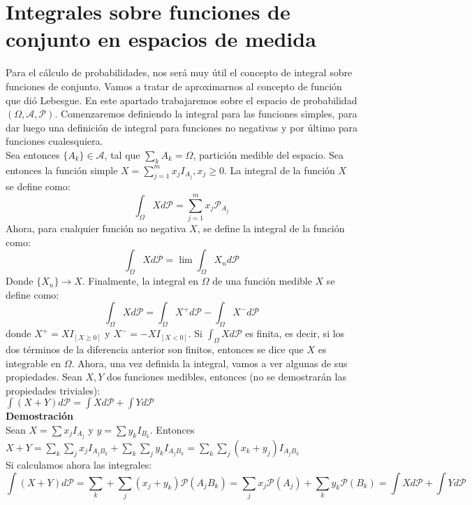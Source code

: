 \documentclass[12pt,a4paper]{book}
\begin{document}
\section{Integrales sobre funciones de conjunto en espacios de medida}
Para el cálculo de probabilidades, nos será muy útil el concepto de integral sobre funciones de conjunto. Vamos a tratar de aproximarnos al concepto de función que dió Lebesgue. En este apartado trabajaremos sobre el espacio de probabilidad $(\Omega, \mathcal{A}, \mathcal{P})$. Comenzaremos definiendo la integral para las funciones simples, para dar luego una definición de integral para funciones no negativas y por último para funciones cualesquiera.\\

Sea entonces $\{A_k\} \in \mathcal{A}$, tal que $\displaystyle \sum_k A_k = \Omega$, partición medible del espacio. Sea entonces la función simple $X = \displaystyle \sum_{j=1}^m x_jI_{A_j}, x_j \geq 0$. La integral de la función $X$ se define como:
$$\int_{\Omega} X d\mathcal{P} = \sum_{j=1}^m x_j\mathcal{P}_{A_j}$$
Ahora, para cualquier función no negativa $X$, se define la integral de la función como:
$$\int_{\Omega} X d\mathcal{P} = \lim \int_{\Omega}X_n d \mathcal{P}$$
Donde $\{X_{n}\} \to X$. Finalmente, la integral en $\Omega$ de una función medible $X$ se define como:
$$\int_{\Omega} X d\mathcal{P} = \int_{\Omega}X^{+} d\mathcal{P} - \int_{\Omega} X^{-} d\mathcal{P}$$
donde $X^{+} = XI_{[X\geq0]}$ y $X^{-} = -XI_{[X<0]}$. Si $\displaystyle \int_{\Omega}Xd\mathcal{P}$ es finita, es decir, si los dos términos de la diferencia anterior son finitos, entonces se dice que $X$ es integrable en $\Omega$. Ahora, una vez definida la integral, vamos a ver algunas de sus propiedades. Sean $X,Y$ dos funciones medibles, entonces (no se demostrarán las propiedades triviales):\\

$\displaystyle \int (X+Y)d\mathcal{P} = \int Xd\mathcal{P} + \int Yd\mathcal{P}$\\

\textbf{Demostración}\\

Sean $X = \displaystyle \sum x_jI_{A_j}$ y $y = \displaystyle \sum y_kI_{B_k}$. Entonces $X+Y = \displaystyle \sum_k \sum_j x_j I_{A_jB_k} + \sum_k \sum_j y_k I_{A_jB_k} = \sum_k \sum_j (x_k+y_j) I_{A_jB_k}$\\

Si calculamos ahora las integrales:
$$ \int (X+Y)d\mathcal{P} = \sum_k + \sum_j (x_j + y_k) \mathcal{P}(A_jB_k) = \sum_j x_j \mathcal{P}(A_j) + \sum_k y_k \mathcal{P}(B_k) = \int Xd\mathcal{P} + \int Yd\mathcal{P}$$
\end{document}
